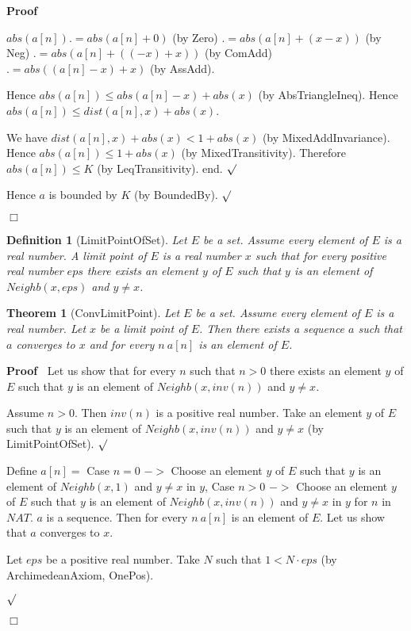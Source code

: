 \documentclass{article}
\newenvironment{forthel}{\begin{leftbar}}{\end{leftbar}}
\newenvironment{proof}{\noindent\textbf{Proof\ }}{\hspace*{\fill}$\Box$\medskip}
\newenvironment{subproof}{\begin{list}{}{}
		\item[\text{Proof}]}{\hfill $\surd$ \end{list}}
\newtheorem{theorem}{Theorem}
\newtheorem{definition}{Definition}
\begin{document}
\begin{forthel}
\begin{proof}
\begin{subproof}
\begin{subproof}
	$abs(a[n]) .= abs(a[n] + 0)$ (by Zero)
	$.= abs(a[n] + (x - x))$ (by Neg)
	$.= abs(a[n] + ((-x) + x))$ (by ComAdd)
	$.= abs((a[n] - x) + x)$ (by AssAdd).
	
	Hence $abs(a[n]) \leq abs(a[n] - x) + abs(x)$ (by AbsTriangleIneq).
	Hence $abs(a[n]) \leq dist(a[n],x) + abs(x)$.
	
	We have $dist(a[n],x) + abs(x) < 1 + abs(x)$ (by MixedAddInvariance).
	Hence $abs(a[n]) \leq 1 + abs(x)$ (by MixedTransitivity).
	Therefore $abs(a[n]) \leq K$ (by LeqTransitivity).
	end.
	\end{subproof}
	Hence $a$ is bounded by $K$ (by BoundedBy).
	\end{subproof}
	\end{proof}
	
	\begin{definition} [LimitPointOfSet]
	Let $E$ be a set. Assume every element of $E$ is a real number. A limit point of $E$
	is a real number $x$ such that for every positive real number $eps$ there exists an element
	$y$ of $E$ such that $y$ is an element of $Neighb(x,eps)$ and $y \neq x$.
	\end{definition}
	
	\begin{theorem} [ConvLimitPoint]
	Let $E$ be a set. Assume every element of $E$ is a real number. Let $x$ be a limit point of $E$.
	Then there exists a sequence $a$ such that $a$ converges to $x$ and for every $n \ a[n]$ is an element of $E$.
	\end{theorem}
	\begin{proof}
	Let us show that for every $n$ such that $n > 0$ there exists an element $y$ of $E$ such that
	$y$ is an element of $Neighb(x,inv(n))$ and $y \neq x$.
	\begin{subproof}
	Assume $n > 0$.
	Then $inv(n)$ is a positive real number.
	Take an element $y$ of $E$ such that $y$ is an element of $Neighb(x,inv(n))$
	and $y \neq x$ (by LimitPointOfSet).
	\end{subproof}
	Define $a[n] =$ Case $n = 0$ $->$ Choose an element $y$ of $E$ such that $y$ is an element of
	$Neighb(x,1)$ and $y \neq x$ in $y$,
	Case $n > 0$ $->$ Choose an element $y$ of $E$ such that $y$ is an element of
	$Neighb(x,inv(n))$ and $y \neq x$ in $y$
	for $n$ in $NAT$.
	$a$ is a sequence.	
	Then for every $n \ a[n]$ is an element of $E$.
	Let us show that $a$ converges to $x$.
	\begin{subproof}
	Let $eps$ be a positive real number.
	Take $N$ such that $1 < N \cdot eps$ (by ArchimedeanAxiom, OnePos).


\end{subproof}
\end{proof}
\end{forthel}
\end{document}
